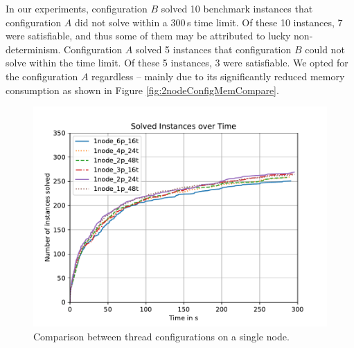 \documentclass[12pt,a4paper,twoside]{scrartcl}
\numberwithin{equation}{section}
\begin{document}
In our experiments, configuration $B$ solved 10 benchmark instances that configuration $A$ did not solve within a $300\,$s time limit. Of these 10 instances, 7 were satisfiable, and thus some of them may be attributed to lucky non-determinism. Configuration $A$ solved 5 instances that configuration $B$ could not solve within the time limit. Of these 5 instances, 3 were satisfiable. We opted for the configuration $A$ regardless -- mainly due to its significantly reduced memory consumption as shown in Figure \ref{fig:2nodeConfigMemCompare}.

\begin{figure}
  \center
  \includegraphics[scale=.5]{plots/config_compare/1node_config_compare.pdf}
  \caption{Comparison between thread configurations on a single node.}
  \label{fig:1nodeConfigCompare}
\end{figure}
\end{document}
